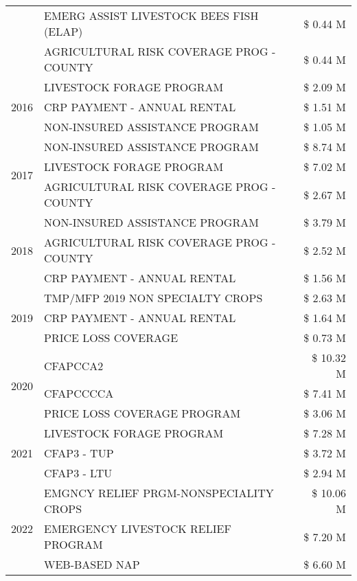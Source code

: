 \begin{tabular}{llr}
 & EMERG ASSIST LIVESTOCK BEES FISH (ELAP) & \$ 0.44 M \\
 & AGRICULTURAL RISK COVERAGE PROG - COUNTY & \$ 0.44 M \\
\cline{1-3}
\multirow[t]{3}{*}{2016} & LIVESTOCK FORAGE PROGRAM & \$ 2.09 M \\
 & CRP PAYMENT - ANNUAL RENTAL & \$ 1.51 M \\
 & NON-INSURED ASSISTANCE PROGRAM & \$ 1.05 M \\
\cline{1-3}
\multirow[t]{3}{*}{2017} & NON-INSURED ASSISTANCE PROGRAM & \$ 8.74 M \\
 & LIVESTOCK FORAGE PROGRAM & \$ 7.02 M \\
 & AGRICULTURAL RISK COVERAGE PROG - COUNTY & \$ 2.67 M \\
\cline{1-3}
\multirow[t]{3}{*}{2018} & NON-INSURED ASSISTANCE PROGRAM & \$ 3.79 M \\
 & AGRICULTURAL RISK COVERAGE PROG - COUNTY & \$ 2.52 M \\
 & CRP PAYMENT - ANNUAL RENTAL & \$ 1.56 M \\
\cline{1-3}
\multirow[t]{3}{*}{2019} & TMP/MFP 2019 NON SPECIALTY CROPS & \$ 2.63 M \\
 & CRP PAYMENT - ANNUAL RENTAL & \$ 1.64 M \\
 & PRICE LOSS COVERAGE & \$ 0.73 M \\
\cline{1-3}
\multirow[t]{3}{*}{2020} & CFAPCCA2 & \$ 10.32 M \\
 & CFAPCCCCA & \$ 7.41 M \\
 & PRICE LOSS COVERAGE PROGRAM & \$ 3.06 M \\
\cline{1-3}
\multirow[t]{3}{*}{2021} & LIVESTOCK FORAGE PROGRAM & \$ 7.28 M \\
 & CFAP3 - TUP & \$ 3.72 M \\
 & CFAP3 - LTU & \$ 2.94 M \\
\cline{1-3}
\multirow[t]{3}{*}{2022} & EMGNCY RELIEF PRGM-NONSPECIALITY CROPS & \$ 10.06 M \\
 & EMERGENCY LIVESTOCK RELIEF PROGRAM & \$ 7.20 M \\
 & WEB-BASED NAP & \$ 6.60 M \\
\cline{1-3}
\bottomrule
\end{tabular}
